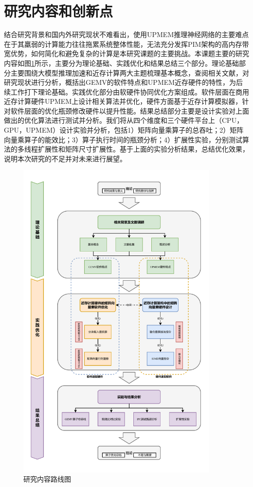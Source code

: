 \section{研究内容和创新点}
结合研究背景和国内外研究现状不难看出，使用UPMEM推理神经网络的主要难点在于其羸弱的计算能力往往拖累系统整体性能，无法充分发挥PIM架构的高内存带宽优势，如何简化和避免复杂的计算是本研究课题的主要挑战。本课题主要的研究内容如图\ref{Content}所示，主要分为理论基础、实践优化和结果总结三个部分。理论基础部分主要围绕大模型推理加速和近存计算两大主题梳理基本概念，查阅相关文献，对研究现状进行分析，概括出GEMV的软件特点和UPMEM近存硬件的特性，为后续工作打下理论基础。实践优化部分由软硬件协同优化方案组成。软件层面在商用近存计算硬件UPMEM上设计相关算法并优化，硬件方面基于近存计算模拟器，针对软件层面的优化瓶颈修改硬件以提升性能。结果总结部分主要是设计实验对上面做出的优化算法进行测试并分析。我们将从四个维度和三个硬件平台上（CPU，GPU，UPMEM）设计实验并分析，包括1）矩阵向量乘算子的总吞吐；2）矩阵向量乘算子的能效比；3）算子执行时间的瓶颈分析；4）扩展性实验，分别测试算法的多线程扩展性和矩阵尺寸扩展性。基于上面的实验分析结果，总结优化效果，说明本次研究的不足并对未来进行展望。

\begin{figure}[!htbp]
	\centering
    \includegraphics[width=0.9\textwidth]{figures/Content.pdf}
    \caption{研究内容路线图}
	\label{Content}
\end{figure}

